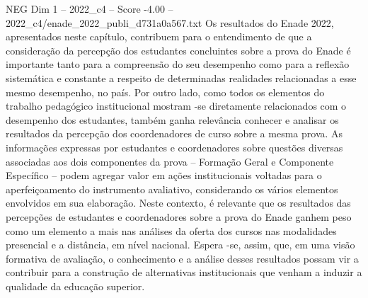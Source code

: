 \begin{textsample}{NEG Dim 1 – 2022\_c4 – Score -4.00 – 2022\_c4/enade\_2022\_publi\_d731a0a567.txt}
Os resultados do Enade 2022, apresentados neste capítulo, contribuem para o entendimento de que a consideração da percepção dos estudantes concluintes sobre a prova do Enade é importante tanto para a compreensão do seu desempenho como para a reflexão sistemática e constante a respeito de determinadas realidades relacionadas a esse mesmo desempenho, no país.
Por outro lado, como todos os elementos do trabalho pedagógico institucional mostram -se diretamente relacionados com o desempenho dos estudantes, também ganha relevância conhecer e analisar os resultados da percepção dos coordenadores de curso sobre a mesma prova.
As informações expressas por estudantes e coordenadores sobre questões diversas associadas aos dois componentes da prova – Formação Geral e Componente Específico – podem agregar valor em ações institucionais voltadas para o aperfeiçoamento do instrumento avaliativo, considerando os vários elementos envolvidos em sua elaboração.
Neste contexto, é relevante que os resultados das percepções de estudantes e coordenadores sobre a prova do Enade ganhem peso como um elemento a mais nas análises da oferta dos cursos nas modalidades presencial e a distância, em nível nacional.
Espera -se, assim, que, em uma visão formativa de avaliação, o conhecimento e a análise desses resultados possam vir a contribuir para a construção de alternativas institucionais que venham a induzir a qualidade da educação superior.

\end{textsample}
